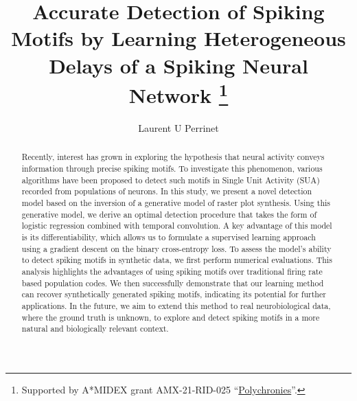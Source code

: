\documentclass[runningheads]{llncs}
\begin{document}
\title{
Accurate Detection of Spiking Motifs by Learning Heterogeneous Delays of a Spiking Neural Network
\thanks{Supported by A*MIDEX grant AMX-21-RID-025 ``\href{https://laurentperrinet.github.io/grant/polychronies/}{Polychronies}''.}
}

\author{
Laurent U Perrinet
}
%
%
%
\maketitle              %
%
\begin{abstract} 
  Recently, interest has grown in exploring the hypothesis that neural activity conveys information through precise spiking motifs. To investigate this phenomenon, various algorithms have been proposed to detect such motifs in Single Unit Activity (SUA) recorded from populations of neurons. In this study, we present a novel detection model based on the inversion of a generative model of raster plot synthesis. Using this generative model, we derive an optimal detection procedure that takes the form of logistic regression combined with temporal convolution. A key advantage of this model is its differentiability, which allows us to formulate a supervised learning approach using a gradient descent on the binary cross-entropy loss. To assess the model's ability to detect spiking motifs in synthetic data, we first perform numerical evaluations. This analysis highlights the advantages of using spiking motifs over traditional firing rate based population codes. We then successfully demonstrate that our learning method can recover synthetically generated spiking motifs, indicating its potential for further applications. In the future, we aim to extend this method to real neurobiological data, where the ground truth is unknown, to explore and detect spiking motifs in a more natural and biologically relevant context.
%
\end{abstract}
\end{document}

